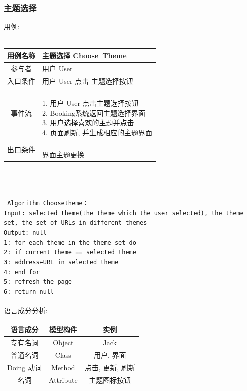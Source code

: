 \documentclass[11pt]{article}
\begin{document}
		\subsubsection{主题选择}
			用例: \\ \\
			\begin{tabular}{c|l}
			\hline
			用例名称 & 主题选择 Choose\ Theme \\ \hline
			参与者 & 用户 User  \\ \hline
			入口条件 & 用户 User 点击 主题选择按钮 \\ \hline
			事件流 & 	\parbox{33em}{\ \\
						1. 用户 User  点击主题选择按钮 \\
						2. Booking系统返回主题选择界面 \\
						3. 用户选择喜欢的主题并点击  \\
						4. 页面刷新, 并生成相应的主题界面 \\
						} \\ \hline
			出口条件 & \parbox{33em}{\ \\
						界面主题更换 \\
						} \\ \hline
			\end{tabular} \\ \\ \\
			\texttt{
			Algorithm Choosetheme：\\
			Input: selected theme(the theme which the user selected), the theme set, the set of URLs in different themes \\
			Output: null \\
			1: for each theme in the theme set do \\
			2:	if current theme == selected theme \\
			3:		address←URL in selected theme \\
			4: end for \\
			5: refresh the page \\
			6: return null \\
			} \\

			语言成分分析: \\
			\begin{center}
			\begin{tabular}{|c|c|c|}
			\hline
			语言成分 & 模型构件 & 实例\\ \hline
			专有名词 & Object & Jack  \\ \hline
			普通名词 & Class & 用户, 界面 \\ \hline
			Doing 动词 & Method &  点击, 更新, 刷新 \\ \hline
			名词 & Attribute & 主题图标按钮 \\ \hline
			\end{tabular}
			\end{center}
\end{document}
